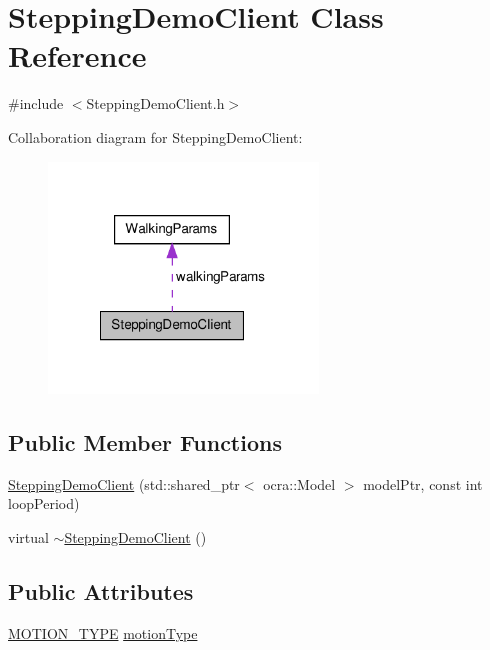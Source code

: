 \hypertarget{classSteppingDemoClient}{\section{\-Stepping\-Demo\-Client \-Class \-Reference}
\label{classSteppingDemoClient}
}


{\ttfamily \#include $<$\-Stepping\-Demo\-Client.\-h$>$}



\-Collaboration diagram for \-Stepping\-Demo\-Client\-:\nopagebreak
\begin{figure}[H]
\begin{center}
\leavevmode
\includegraphics[width=203pt]{classSteppingDemoClient__coll__graph}
\end{center}
\end{figure}
\subsection*{\-Public \-Member \-Functions}
\begin{DoxyCompactItemize}
\item 
\hyperlink{classSteppingDemoClient_a28e41547ba5641741ceb3b378a5983db}{\-Stepping\-Demo\-Client} (std\-::shared\-\_\-ptr$<$ ocra\-::\-Model $>$ model\-Ptr, const int loop\-Period)
\item 
virtual \hyperlink{classSteppingDemoClient_a573eed904c7262c5cdbaf6e254d72559}{$\sim$\-Stepping\-Demo\-Client} ()
\end{DoxyCompactItemize}
\subsection*{\-Public \-Attributes}
\begin{DoxyCompactItemize}
\item 
\hyperlink{SteppingDemoClient_8h_abd6d177d63e98aa1b4ed4b8329e2a379}{\-M\-O\-T\-I\-O\-N\-\_\-\-T\-Y\-P\-E} \hyperlink{classSteppingDemoClient_aa880debbcbed0298ae1769dd8a3f721b}{motion\-Type}
\end{DoxyCompactItemize}
